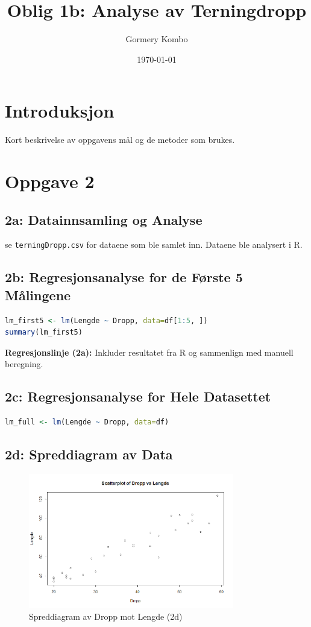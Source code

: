\documentclass{article}
\title{Oblig 1b: Analyse av Terningdropp}
\author{Gormery Kombo}
\date{\today}
\begin{document}
\maketitle

\section{Introduksjon}
Kort beskrivelse av oppgavens mål og de metoder som brukes.


\section{Oppgave 2}
\subsection{2a: Datainnsamling og Analyse}
se \texttt{terningDropp.csv} for dataene som ble samlet inn. Dataene ble analysert i R.
\subsection{2b: Regresjonsanalyse for de Første 5 Målingene}
\begin{lstlisting}[language=R]
lm_first5 <- lm(Lengde ~ Dropp, data=df[1:5, ])
summary(lm_first5)
\end{lstlisting}
\textbf{Regresjonslinje (2a):} Inkluder resultatet fra R og sammenlign med manuell beregning.

\subsection{2c: Regresjonsanalyse for Hele Datasettet}
\begin{lstlisting}[language=R]
lm_full <- lm(Lengde ~ Dropp, data=df)
\end{lstlisting}

\subsection{2d: Spreddiagram av Data}
\begin{figure}[H]
    \centering
    \includegraphics[width=0.8\textwidth]{Rplot03.png}
    \caption{Spreddiagram av Dropp mot Lengde (2d)}
\end{figure}
\end{document}
